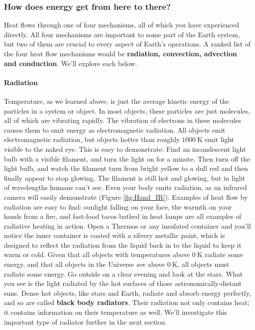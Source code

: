 \documentclass[amstex,12pt]{book}
\begin{document}
\subsubsection{How does energy get from here to there?}
Heat flows through one of four mechanisms, all of which you have experienced directly. All four mechanisms are important to some part of the Earth system, but two of them are crucial to every aspect of Earth’s operations. A ranked list of the four heat flow mechanisms would be \textbf{radiation, convection, advection and conduction}. We’ll explore each below.

\paragraph{Radiation}
Temperature, as we learned above, is just the average kinetic energy of the particles in a system or object. In most objects, these particles are just molecules, all of which are vibrating rapidly. The vibration of electrons in these molecules causes them to emit energy as electromagnetic radiation. All objects emit electromagnetic radiation, but objects hotter than roughly $\SI{1000}{\kelvin}$ emit light visible to the naked eye. This is easy to demonstrate: Find an incandescent light bulb with a visible filament, and turn the light on for a minute. Then turn off the light bulb, and watch the filament turn from bright yellow to a dull red and then finally appear to stop glowing. The filament is still hot and glowing, but in light of wavelengths humans can't see. Even your body emits radiation, as an infrared camera will easily demonstrate (Figure \ref{fig:Hand_IR}). Examples of heat flow by radiation are easy to find: sunlight falling on your face, the warmth on your hands from a fire, and fast-food tacos bathed in heat lamps are all examples of radiative heating in action. Open a Thermos or any insulated container and you'll notice the inner container is coated with a silvery metallic paint, which is designed to reflect the radiation from the liquid back in to the liquid to keep it warm or cold.
Given that all objects with temperatures above $\SI{0}{\kelvin}$ radiate some energy, and that all objects in the Universe \textit{are} above $\SI{0}{\kelvin}$, all objects must radiate some energy. Go outside on a clear evening and look at the stars. What you see is the light radiated by the hot surfaces of those astronomically-distant suns. Dense hot objects, like stars and Earth, radiate and absorb energy perfectly, and so are called \textbf{black body radiators}. Their radiation not only contains heat; it contains information on their temperature as well. We'll investigate this important type of radiator further in the next section.
\end{document}
